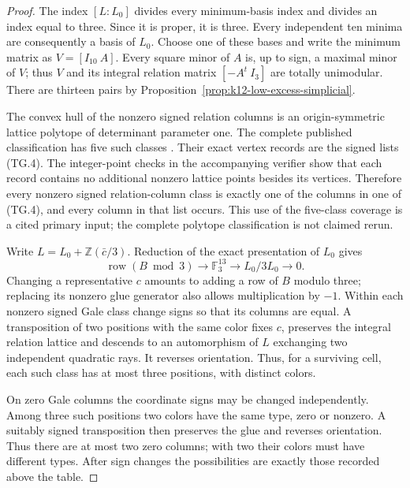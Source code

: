 \begin{proof}
The index $[L:L_0]$ divides every minimum-basis index and divides an
index equal to three. Since it is proper, it is three. Every independent
ten minima are consequently a basis of $L_0$. Choose one of these
bases and write the minimum matrix as $V=[I_{10}\ A]$.
Every square minor of $A$ is, up to sign, a maximal minor of $V$;
thus $V$ and its integral relation matrix $[-A^t\ I_3]$ are totally
unimodular. There are thirteen pairs by
Proposition~\ref{prop:k12-low-excess-simplicial}.

The convex hull of the nonzero signed relation columns is an
origin-symmetric lattice polytope of determinant parameter one.
The complete published classification has five such classes
\cite[\S5.2, Table~2, p.~85]{AverkovSchymura2024}.
Their exact vertex records are the signed lists (TG.4).
The integer-point checks in the accompanying verifier show that each
record contains no additional nonzero lattice points besides its
vertices. Therefore every nonzero signed relation-column class is
exactly one of the columns in one of (TG.4), and every column in that
list occurs. This use of the five-class coverage is a cited primary
input; the complete polytope classification is not claimed rerun.

Write $L=L_0+\mathbb Z(\bar c/3)$. Reduction of the exact presentation
of $L_0$ gives
\[
 \operatorname{row}(B\bmod3)\longrightarrow\mathbb F_3^{13}
      \longrightarrow L_0/3L_0\longrightarrow0.                 \tag{TG.6}
\]
Changing a representative $c$ amounts to adding a row of $B$ modulo
three; replacing its nonzero glue generator also allows multiplication
by $-1$.
Within each nonzero signed Gale class change signs so that its
columns are equal. A transposition of two positions with the same
color fixes $c$, preserves the integral relation lattice and descends
to an automorphism of $L$ exchanging two independent quadratic rays.
It reverses orientation. Thus, for a surviving cell, each such class
has at most three positions, with distinct colors.

On zero Gale columns the coordinate signs may be changed independently.
Among three such positions two colors have the same type, zero or
nonzero. A suitably signed transposition then preserves the glue and
reverses orientation. Thus there are at most two zero columns; with
two their colors must have different types. After sign changes the
possibilities are exactly those recorded above the table.


\end{proof}
